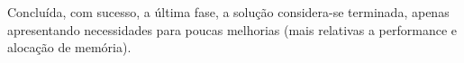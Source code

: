 Concluída, com sucesso, a última fase, a solução considera-se
terminada, apenas apresentando necessidades para poucas
melhorias (mais relativas a performance e alocação de
memória).